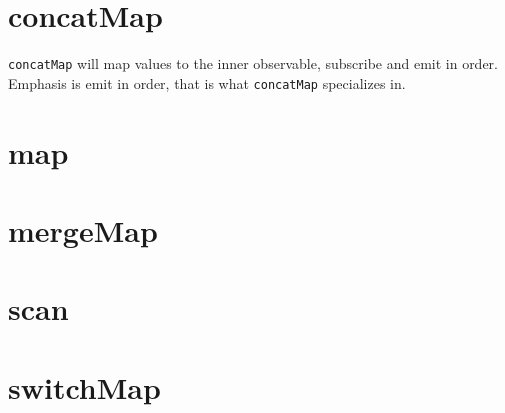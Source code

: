 \section{concatMap}
\lstinline{concatMap} will map values to the inner observable, subscribe and 
emit in order. Emphasis is emit in order, that is what \lstinline{concatMap} 
specializes in. 

\section{map} 

\section{mergeMap}

\section{scan}

\section{switchMap}